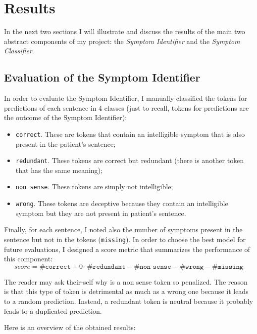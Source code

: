 \chapter{Results}
\label{cha:results}
In the next two sections I will illustrate and discuss the results of the main two abstract components of my project: the \textit{Symptom Identifier} and the \textit{Symptom Classifier}.

\section{Evaluation of the Symptom Identifier}
In order to evaluate the Symptom Identifier, I manually classified the tokens for predictions of each sentence in 4 classes (just to recall, tokens for predictions are the outcome of the Symptom Identifier):
\begin{itemize}
  \item \texttt{correct}. These are tokens that contain an intelligible symptom that is also present in the patient's sentence;
  \item \texttt{redundant}. These tokens are correct but redundant (there is another token that has the same meaning);
  \item \texttt{non sense}. These tokens are simply not intelligible;
  \item \texttt{wrong}. These tokens are deceptive because they contain an intelligible symptom but they are not present in patient's sentence.
\end{itemize}

Finally, for each sentence, I noted also the number of symptoms present in the sentence but not in the tokens (\texttt{missing}). In order to choose the best model for future evaluations, I designed a score metric that summarizes the performance of this component:
\begin{equation}
score = \texttt{\#correct} + 0 \cdot \texttt{\#redundant} - \texttt{\#non sense} - \texttt{\#wrong} - \texttt{\#missing}
\end{equation}

The reader may ask their-self why is a non sense token so penalized. The reason is that this type of token is detrimental as much as a wrong one because it leads to a random prediction. Instead, a redundant token is neutral because it probably leads to a duplicated prediction.

Here is an overview of the obtained results:


